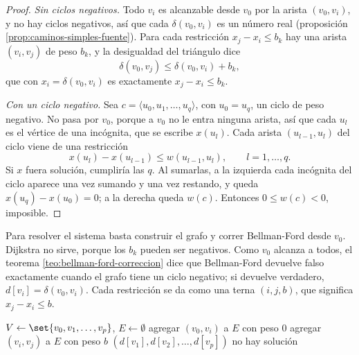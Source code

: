 \documentclass[11pt,letterpaper]{article}
\begin{document}
\begin{proof}
  \textit{Sin ciclos negativos.} Todo $v_i$ es alcanzable desde $v_0$
  por la arista $(v_0, v_i)$, y no hay ciclos negativos, así que cada
  $\delta(v_0, v_i)$ es un número real (proposición
  \ref{prop:caminos-simples-fuente}). Para cada restricción
  $x_j - x_i \le b_k$ hay una arista $(v_i, v_j)$ de peso $b_k$, y la
  desigualdad del triángulo dice
  \[
    \delta(v_0, v_j) \le \delta(v_0, v_i) + b_k ,
  \]
  que con $x_i = \delta(v_0, v_i)$ es exactamente
  $x_j - x_i \le b_k$.

  \textit{Con un ciclo negativo.} Sea
  $c = \langle u_0, u_1, \dots, u_q\rangle$, con $u_0 = u_q$, un ciclo
  de peso negativo. No pasa por $v_0$, porque a $v_0$ no le entra
  ninguna arista, así que cada $u_l$ es el vértice de una incógnita,
  que se escribe $x(u_l)$. Cada arista $(u_{l-1}, u_l)$ del ciclo
  viene de una restricción
  \[
    x(u_l) - x(u_{l-1}) \le w(u_{l-1}, u_l) ,
    \qquad l = 1, \dots, q .
  \]
  Si $x$ fuera solución, cumpliría las $q$. Al sumarlas, a la
  izquierda cada incógnita del ciclo aparece una vez sumando y una vez
  restando, y queda $x(u_q) - x(u_0) = 0$; a la derecha queda
  $w(c)$. Entonces $0 \le w(c) < 0$, imposible.
\end{proof}

Para resolver el sistema basta construir el grafo y correr
Bellman-Ford desde $v_0$. Dijkstra no sirve, porque los $b_k$ pueden
ser negativos. Como $v_0$ alcanza a todos, el teorema
\ref{teo:bellman-ford-correccion} dice que Bellman-Ford devuelve falso
exactamente cuando el grafo tiene un ciclo negativo; si devuelve
verdadero, $d[v_i] = \delta(v_0, v_i)$. Cada restricción se da como
una terna $(i, j, b)$, que significa $x_j - x_i \le b$.

\begin{algorithm}[H]
\caption{\textsc{Resolver-Restricciones}$(p, R)$}
\label{alg:resolver-restricciones}
\begin{algorithmic}[1]
  \State $V \gets \set{v_0, v_1, \dots, v_p}$, \quad $E \gets \emptyset$
    \State agregar $(v_0, v_i)$ a $E$ con peso $0$
  \EndFor
    \State agregar $(v_i, v_j)$ a $E$ con peso $b$
  \EndFor
    \State \Return $(d[v_1], d[v_2], \dots, d[v_p])$
  \Else
    \State \Return no hay solución 
  \EndIf
\EndProcedure
\end{algorithmic}
\end{algorithm}
\end{document}

